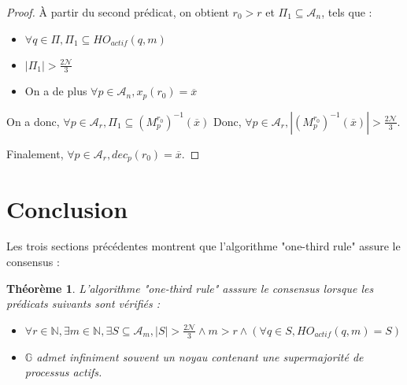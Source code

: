 \documentclass{article}
\newtheorem{theorem}{Théorème}
\begin{document}
\begin{proof}
	À partir du second prédicat, on obtient $r_0 > r$ et $\Pi_1 \subseteq \mathcal{A}_n$, tels que :
	\begin{itemize}

		\item $\forall q \in \Pi, \Pi_1 \subseteq HO_{actif}(q, m)$
		\item $|\Pi_1| > \frac{2\mathcal{N}}{3}$
		\item On a de plus $\forall p \in \mathcal{A}_n, x_p(r_0) = \overline{x}$

	\end{itemize}

	On a donc, $\forall p \in \mathcal{A}_r, \Pi_1 \subseteq (M_p^{r_0})^{-1}(\overline{x}) $
	Donc, $\forall p \in \mathcal{A}_r, |(M_p^{r_0})^{-1}(\overline{x})| > \frac{2\mathcal{N}}{3} $.

	Finalement, $\forall p \in \mathcal{A}_r, dec_p(r_0) = \overline{x}$.

\end{proof}

\section{Conclusion}

Les trois sections précédentes montrent que l'algorithme "one-third rule" assure le consensus :

	\begin{theorem}

		 L'algorithme "one-third rule" asssure le consensus lorsque les prédicats suivants sont vérifiés :
		\begin{itemize}
			\item $\forall r \in \mathds{N}, \exists m \in \mathds{N}, \exists S \subseteq \mathcal{A}_m, |S| > \frac{2\mathcal{N}}{3} \wedge m > r \wedge (\forall q \in S, HO_{actif}(q, m) = S)$
			\item $\mathds{G}$ admet infiniment souvent un noyau contenant une supermajorité de processus actifs.
		\end{itemize}
	\end{theorem}
\end{document}

